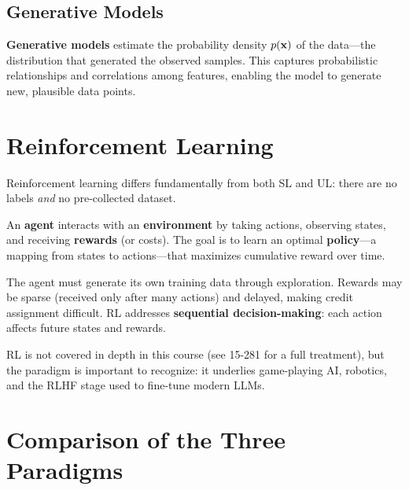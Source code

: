 \subsection*{Generative Models}

\textbf{Generative models} estimate the probability density $p(\mathbf{x})$ of the data---the distribution that generated the observed samples. This captures probabilistic relationships and correlations among features, enabling the model to generate new, plausible data points.

\section*{Reinforcement Learning}

Reinforcement learning differs fundamentally from both SL and UL: there are no labels \emph{and} no pre-collected dataset.

\begin{definition}
An \textbf{agent} interacts with an \textbf{environment} by taking actions, observing states, and receiving \textbf{rewards} (or costs). The goal is to learn an optimal \textbf{policy}---a mapping from states to actions---that maximizes cumulative reward over time.
\end{definition}

\begin{remark}
The agent must generate its own training data through exploration. Rewards may be sparse (received only after many actions) and delayed, making credit assignment difficult. RL addresses \textbf{sequential decision-making}: each action affects future states and rewards.
\end{remark}

RL is not covered in depth in this course (see 15-281 for a full treatment), but the paradigm is important to recognize: it underlies game-playing AI, robotics, and the RLHF stage used to fine-tune modern LLMs.

\section*{Comparison of the Three Paradigms}

